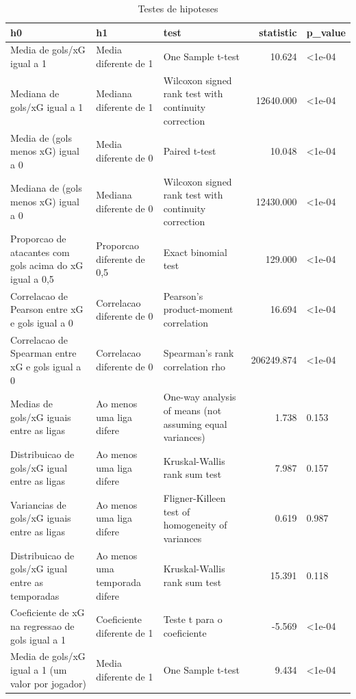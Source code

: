 \begin{table}

\caption{\label{tab:testes_g20}Testes de hipoteses}
\centering
\begin{tabular}[t]{lllrl}
\toprule
h0 & h1 & test & statistic & p\_value\\
\midrule
Media de gols/xG igual a 1 & Media diferente de 1 & One Sample t-test & 10.624 & <1e-04\\
Mediana de gols/xG igual a 1 & Mediana diferente de 1 & Wilcoxon signed rank test with continuity correction & 12640.000 & <1e-04\\
Media de (gols menos xG) igual a 0 & Media diferente de 0 & Paired t-test & 10.048 & <1e-04\\
Mediana de (gols menos xG) igual a 0 & Mediana diferente de 0 & Wilcoxon signed rank test with continuity correction & 12430.000 & <1e-04\\
Proporcao de atacantes com gols acima do xG igual a 0,5 & Proporcao diferente de 0,5 & Exact binomial test & 129.000 & <1e-04\\
\addlinespace
Correlacao de Pearson entre xG e gols igual a 0 & Correlacao diferente de 0 & Pearson's product-moment correlation & 16.694 & <1e-04\\
Correlacao de Spearman entre xG e gols igual a 0 & Correlacao diferente de 0 & Spearman's rank correlation rho & 206249.874 & <1e-04\\
Medias de gols/xG iguais entre as ligas & Ao menos uma liga difere & One-way analysis of means (not assuming equal variances) & 1.738 & 0.153\\
Distribuicao de gols/xG igual entre as ligas & Ao menos uma liga difere & Kruskal-Wallis rank sum test & 7.987 & 0.157\\
Variancias de gols/xG iguais entre as ligas & Ao menos uma liga difere & Fligner-Killeen test of homogeneity of variances & 0.619 & 0.987\\
\addlinespace
Distribuicao de gols/xG igual entre as temporadas & Ao menos uma temporada difere & Kruskal-Wallis rank sum test & 15.391 & 0.118\\
Coeficiente de xG na regressao de gols igual a 1 & Coeficiente diferente de 1 & Teste t para o coeficiente & -5.569 & <1e-04\\
Media de gols/xG igual a 1 (um valor por jogador) & Media diferente de 1 & One Sample t-test & 9.434 & <1e-04\\
\bottomrule
\end{tabular}
\end{table}
